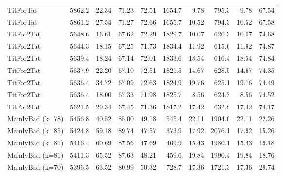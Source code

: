 \documentclass[journal,10pt,twoside]{IEEEtran}
\begin{document}
\begin{table}[ht]
\begin{tabular}{l|rrrr|rrrrr}
        TitForTat         & 5862.2 &  22.34 &  71.23 &   72.51 & 1654.7 &                   9.78 &  795.3 &                    9.78 &    67.54 \\
        TitForTat         & 5861.2 &  27.54 &  71.27 &   72.66 & 1655.7 &                  10.52 &  794.3 &                   10.52 &    67.58 \\
        TitFor2Tat        & 5648.6 &  16.61 &  67.62 &   72.29 & 1829.7 &                  10.07 &  620.3 &                   10.07 &    74.68 \\
        TitFor2Tat        & 5644.3 &  18.15 &  67.25 &   71.73 & 1834.4 &                  11.92 &  615.6 &                   11.92 &    74.87 \\
        TitFor2Tat        & 5639.4 &  18.24 &  67.14 &   72.01 & 1833.6 &                  18.54 &  616.4 &                   18.54 &    74.84 \\
        TitFor2Tat        & 5637.9 &  22.20 &  67.10 &   72.51 & 1821.5 &                  14.67 &  628.5 &                   14.67 &    74.35 \\
        TitFor2Tat        & 5636.4 &  34.72 &  67.09 &   72.63 & 1824.9 &                  19.76 &  625.1 &                   19.76 &    74.49 \\
        TitFor2Tat        & 5636.4 &  18.00 &  67.33 &   71.98 & 1825.7 &                   8.56 &  624.3 &                    8.56 &    74.52 \\
        TitFor2Tat        & 5621.5 &  29.34 &  67.45 &   71.36 & 1817.2 &                  17.42 &  632.8 &                   17.42 &    74.17 \\
        MainlyBad (k=78)  & 5456.8 &  40.52 &  85.00 &   49.18 &  545.4 &                  22.11 & 1904.6 &                   22.11 &    22.26 \\
        MainlyBad (k=85)  & 5424.8 &  59.18 &  89.74 &   47.57 &  373.9 &                  17.92 & 2076.1 &                   17.92 &    15.26 \\
        MainlyBad (k=81)  & 5416.4 &  60.69 &  87.56 &   47.69 &  469.9 &                  15.43 & 1980.1 &                   15.43 &    19.18 \\
        MainlyBad (k=81)  & 5411.3 &  65.52 &  87.63 &   48.21 &  459.6 &                  19.84 & 1990.4 &                   19.84 &    18.76 \\
        MainlyBad (k=70)  & 5396.5 &  63.52 &  80.99 &   50.32 &  728.7 &                  17.36 & 1721.3 &                   17.36 &    29.74 \\

\end{tabular}
\end{table}
\end{document}
